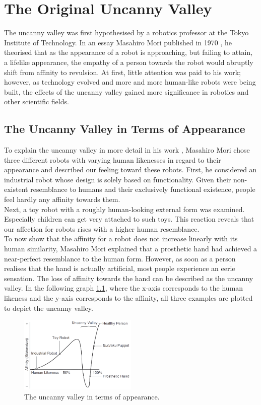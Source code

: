 \chapter{The Original Uncanny Valley}
The uncanny valley was first hypothesised by a robotics professor at the Tokyo Institute of Technology. In an essay Masahiro Mori published in 1970 \cite{original_masahiro_not_translated}, he theorised that as the appearance of a robot is approaching, but failing to attain, a lifelike appearance, the empathy of a person towards the robot would abruptly shift from affinity to revulsion.
At first, little attention was paid to his work; however, as technology evolved and more and more human-like robots were being built, the effects of the uncanny valley gained more significance in robotics and other scientific fields.

\section{The Uncanny Valley in Terms of Appearance}
To explain the uncanny valley in more detail in his work \cite{original_masahiro}, Masahiro Mori chose three different robots with varying human likenesses in regard to their appearance and described our feeling toward these robots. First, he considered an industrial robot whose design is solely based on functionality. Given their non-existent resemblance to humans and their exclusively functional existence, people feel hardly any affinity towards them.\\
Next, a toy robot with a roughly human-looking external form was examined. Especially children can get very attached to such toys. This reaction reveals that our affection for robots rises with a higher human resemblance.\\
To now show that the affinity for a robot does not increase linearly with its human similarity, Masahiro Mori explained that a prosthetic hand had achieved a near-perfect resemblance to the human form. However, as soon as a person realises that the hand is actually artificial, most people experience an eerie sensation. The loss of affinity towards the hand can be described as the uncanny valley.
In the following graph \ref{fig:uv_appearance}, where the x-axis corresponds to the human likeness and the y-axis corresponds to the affinity, all three examples are plotted to depict the uncanny valley. 
\begin{figure} %
    \centering
    \includegraphics[width=0.5\textwidth]{graphics/uv_appearance.png}
    \caption{The uncanny valley in terms of appearance.}
    \label{fig:uv_appearance}
\end{figure}
